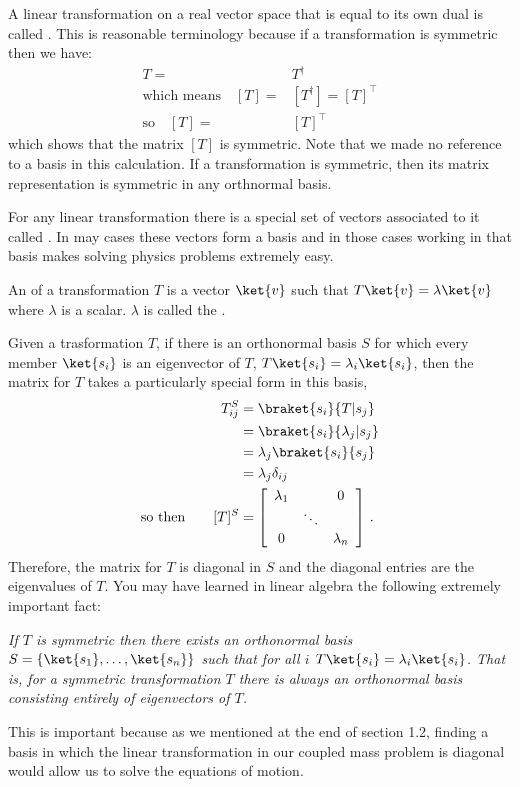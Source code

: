 A linear transformation on a real vector space that is equal to its own dual is called .
This is reasonable terminology because if a transformation is symmetric then we have:
\begin{align*}
  T =& T^{\dag} \\
  \textrm{which means} \quad
  [T] =& [T^{\dag}] = [T]^{\top} \\
  \textrm{so} \quad
  [T] =& [T]^{\top}
\end{align*}
which shows that the matrix $[T]$ is symmetric.
Note that we made no reference to a basis in this calculation.
If a transformation is symmetric, then its matrix representation is symmetric in any orthnormal basis.


For any linear transformation there is a special set of vectors associated to it called .
In may cases these vectors form a basis and in those cases working in that basis makes solving physics problems extremely easy.

\begin{definition}
  An  of a transformation $T$ is a vector $\ket{v}$ such that \mbox{$T\ket{v} = \lambda \ket{v}$} where $\lambda$ is a scalar.  $\lambda$ is called the .
\end{definition}

Given a trasformation $T$, if there is an orthonormal basis $S$ for which every member $\ket{s_i}$ is an eigenvector of $T$, \mbox{$T\ket{s_i}=\lambda_i\ket{s_i}$}, then the matrix for $T$ takes a particularly special form in this basis,
\begin{align*}
  T^{S}_{ij} &= \braket{s_i}{T|s_j}\\
  &= \braket{s_i}{\lambda _j|s_j}\\
  &= \lambda _j \braket{s_i}{s_j}\\
  &= \lambda _j \delta _{ij}\\
\textrm{so then} \qquad
  [T]^S &= \left[ \begin{array}{ccc} \lambda_1 & & 0 \\ & \ddots & \\ 0 & & \lambda_n \end{array} \right]
  \, .
\end{align*}
Therefore, the matrix for $T$ is diagonal in $S$ and the diagonal entries are the eigenvalues of $T$.
You may have learned in linear algebra the following extremely important fact:
\begin{center} \emph{If $T$ is symmetric then there exists an orthonormal basis $S = \{\ket{s_1}, \ldots, \ket{s_n} \}$ such that for all $i$ $T\ket{s_i} = \lambda_i\ket{s_i}$.  That is, for a symmetric transformation $T$ there is always an orthonormal basis consisting entirely of eigenvectors of $T$.} \end{center}
This is important because as we mentioned at the end of section 1.2, finding a basis in which the linear transformation in our coupled mass problem is diagonal would allow us to solve the equations of motion.

